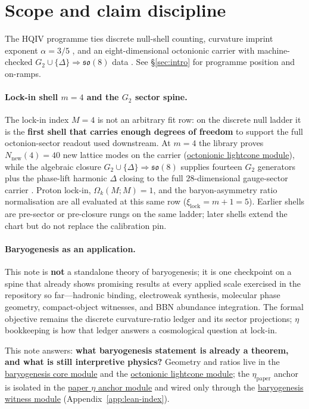 \documentclass[11pt]{amsart}
\newcommand{\LeanEng}[2]{\hyperref[#1]{#2}}
\begin{document}
\section{Scope and claim discipline}
\label{sec:scope}

The HQIV programme ties discrete null-shell counting, curvature imprint
exponent $\alpha=3/5$ \cite{brodie2026}, and an eight-dimensional
octonionic carrier with machine-checked
$G_2\cup\{\Delta\}\Rightarrow\mathfrak{so}(8)$ data
\cite{hqiv-so8-paper,hqiv-3d-growth-paper}. See \S\ref{sec:intro} for
programme position and on-ramps.

\paragraph{Lock-in shell $m=4$ and the $G_2$ sector spine.}
The lock-in index $M=4$ is not an arbitrary fit row: on
the discrete null ladder it is the \textbf{first shell that carries enough
degrees of freedom} to support the full octonion-sector readout used
downstream. At $m=4$ the library proves $N_{\mathrm{new}}(4)=40$ new
lattice modes on the carrier
(\LeanEng{lean:lightcone}{octonionic lightcone module}), while the
algebraic closure $G_2\cup\{\Delta\}\Rightarrow\mathfrak{so}(8)$ supplies
fourteen $G_2$ generators plus the phase-lift harmonic $\Delta$ closing to
the full $28$-dimensional gauge-sector carrier
\cite{hqiv-so8-paper}. Proton lock-in, $\Omega_k(M;M)=1$, and the
baryon-asymmetry ratio normalisation are all evaluated at this same row
($\xi_{\mathrm{lock}}=m+1=5$). Earlier shells are pre-sector or
pre-closure rungs on the same ladder; later shells extend the chart but do
not replace the calibration pin.

\paragraph{Baryogenesis as an application.}
This note is \textbf{not} a standalone theory of baryogenesis; it is one
checkpoint on a spine that already shows promising results at every applied
scale exercised in the repository so far---hadronic binding, electroweak
synthesis, molecular phase geometry, compact-object witnesses, and BBN
abundance integration. The formal objective remains the discrete
curvature-ratio ledger and its sector projections; $\eta$ bookkeeping is
how that ledger answers a cosmological question at lock-in.

This note answers: \textbf{what baryogenesis statement is already a
theorem, and what is still interpretive physics?} Geometry and ratios
live in the \LeanEng{lean:baryogenesis-core}{baryogenesis core module}
and the \LeanEng{lean:lightcone}{octonionic lightcone module}; the
$\eta_{\mathrm{paper}}$ anchor is isolated in the
\LeanEng{lean:eta-paper}{paper $\eta$ anchor module} and wired
only through the \LeanEng{lean:baryogenesis-witness}{baryogenesis witness
module} (Appendix~\ref{app:lean-index}).
\end{document}
